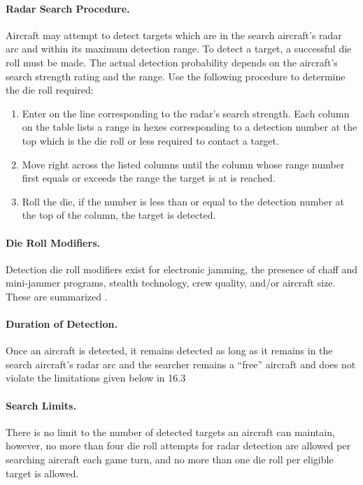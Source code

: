 {\paragraph{Radar Search Procedure.} Aircraft may attempt to detect targets which are in the search aircraft's radar arc and within its maximum detection range. To detect a target, a successful die roll must be made. The actual detection probability depends on the aircraft's search strength rating and the range. Use the following procedure to determine the die roll required:


\begin{enumerate}
    \item Enter  on the line corresponding to the radar's search strength. Each column on the table lists a range in hexes corresponding to a detection number at the top which is the die roll or less required to contact a target.
    \item Move right across the listed columns until the column whose range number first equals or exceeds the range the target is at is reached.
    \item Roll the die, if the number is less than or equal to the detection number at the top of the column, the target is detected.
\end{enumerate}

\paragraph{Die Roll Modifiers.} Detection die roll modifiers exist for electronic jamming, the presence of chaff and mini-jammer programs, stealth technology, crew quality, and/or aircraft size. These are summarized .

\paragraph{Duration of Detection.} Once an aircraft is detected, it remains detected as long as it remains in the search aircraft's radar arc and the searcher remains a “free” aircraft and does not violate the limitations given below in 16.3

\paragraph{Search Limits.} There is no limit to the number of detected targets an aircraft can maintain, however, no more than four die roll attempts for radar detection are allowed per searching aircraft each game turn, and no more than one die roll per eligible target is allowed.

}

